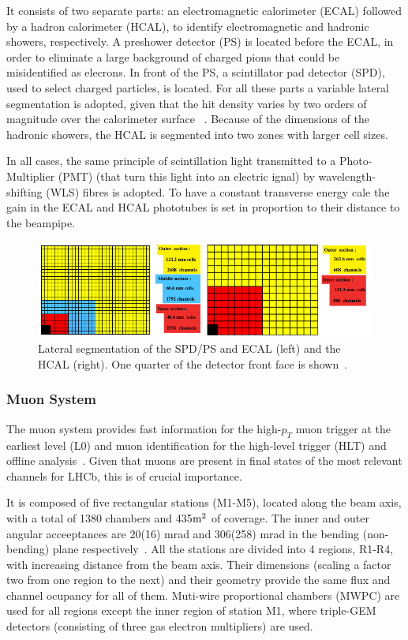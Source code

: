 It consists of two separate parts: an electromagnetic calorimeter (ECAL) followed by a hadron calorimeter (HCAL), to identify electromagnetic and hadronic showers, respectively. A preshower detector (PS) is located before the ECAL, in order to eliminate a large background of charged pions that could be misidentified as elecrons. In front of the PS, a scintillator pad detector (SPD), used to select charged particles, is located. For all these parts a variable lateral segmentation is adopted, given that the hit density varies by two orders of magnitude over the calorimeter surface ~\cite{Alves:2008zz}. Because of the dimensions of the hadronic showers, the HCAL is segmented into two zones with larger cell sizes. 

In all cases, the same principle of scintillation light transmitted to a Photo-Multiplier (PMT) (that turn this light into an electric ignal) by wavelength-shifting (WLS) fibres is adopted. To have a constant transverse energy cale the gain in the ECAL and HCAL phototubes is set in proportion to their distance to the beampipe.  

\begin{figure} [htb!]
\begin{center}
\includegraphics[scale=0.7]{figs/CALO.png}
\caption{Lateral segmentation of the SPD/PS and ECAL (left) and the HCAL (right). One quarter of the detector front face is shown~\cite{Alves:2008zz}.\label{fig:lhcb_calo}}
\end{center}
\end{figure}

\subsubsection{Muon System} 
The muon system provides fast information for the high-$p_T$ muon trigger at the earliest level (L0) and muon identification for the high-level trigger (HLT) and offline analysis~\cite{Alves:2008zz}. Given that muons are present in final states of the most relevant channels for LHCb, this is of crucial importance.

It is composed of five rectangular stations (M1-M5), located along the beam axis, with a total of 1380 chambers and 435$\rm m^2$ of coverage. The inner and outer angular acceeptances are 20(16) mrad and 306(258) mrad in the bending (non-bending) plane respectively~\cite{Alves:2008zz}. All the stations are divided into 4 regions, R1-R4, with increasing distance from the beam axis. Their dimensions (scaling a factor two  from one region to the next) and their geometry provide the same flux and channel ocupancy for all of them. Muti-wire proportional chambers (MWPC) are used for all regions except the inner region of station M1, where triple-GEM detectors (consisting of three gas electron multipliers) are used. 


